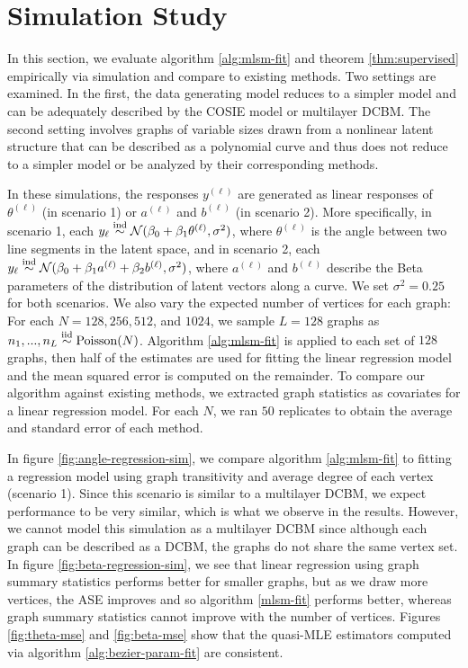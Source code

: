 \documentclass[12pt]{article}
\begin{document}
\section{Simulation Study}\label{simulation-study}

In this section, we evaluate algorithm \ref{alg:mlsm-fit} and theorem
\ref{thm:supervised} empirically via simulation and compare to existing
methods. Two settings are examined. In the first, the data generating
model reduces to a simpler model and can be adequately described by the
COSIE model or multilayer DCBM. The second setting involves graphs of
variable sizes drawn from a nonlinear latent structure that can be
described as a polynomial curve and thus does not reduce to a simpler
model or be analyzed by their corresponding methods.

In these simulations, the responses \(y^{(\ell)}\) are generated as
linear responses of \(\theta^{(\ell)}\) (in scenario 1) or
\(a^{(\ell)}\) and \(b^{(\ell)}\) (in scenario 2). More specifically, in
scenario 1, each
\(y_\ell \stackrel{\mathrm{ind}}{\sim} \mathcal{N}(\beta_0 + \beta_1 \theta^{(\ell)}, \sigma^2)\),
where \(\theta^{(\ell)}\) is the angle between two line segments in the
latent space, and in scenario 2, each
\(y_\ell \stackrel{\mathrm{ind}}{\sim} \mathcal{N}(\beta_0 + \beta_1 a^{(\ell)} + \beta_2 b^{(\ell)}, \sigma^2)\),
where \(a^{(\ell)}\) and \(b^{(\ell)}\) describe the Beta parameters of
the distribution of latent vectors along a curve. We set
\(\sigma^2 = 0.25\) for both scenarios. We also vary the expected number
of vertices for each graph: For each \(N = 128, 256, 512\), and
\(1024\), we sample \(L = 128\) graphs as
\(n_1, ..., n_L \stackrel{\mathrm{iid}}{\sim} \mathrm{Poisson}(N)\). Algorithm \ref{alg:mlsm-fit} is
applied to each set of \(128\) graphs, then half of the estimates are
used for fitting the linear regression model and the mean squared error
is computed on the remainder. To compare our algorithm against existing
methods, we extracted graph statistics as covariates for a linear
regression model. For each \(N\), we ran \(50\) replicates to obtain the
average and standard error of each method.

In figure \ref{fig:angle-regression-sim}, we compare algorithm
\ref{alg:mlsm-fit} to fitting a regression model using graph
transitivity and average degree of each vertex (scenario 1). Since this
scenario is similar to a multilayer DCBM, we expect performance to be
very similar, which is what we observe in the results. However, we
cannot model this simulation as a multilayer DCBM since although each
graph can be described as a DCBM, the graphs do not share the same
vertex set. In figure \ref{fig:beta-regression-sim}, we see that linear
regression using graph summary statistics performs better for smaller
graphs, but as we draw more vertices, the ASE improves and so algorithm
\ref{mlsm-fit} performs better, whereas graph summary statistics cannot
improve with the number of vertices. Figures \ref{fig:theta-mse} and
\ref{fig:beta-mse} show that the quasi-MLE estimators computed via
algorithm \ref{alg:bezier-param-fit} are consistent.
\end{document}
